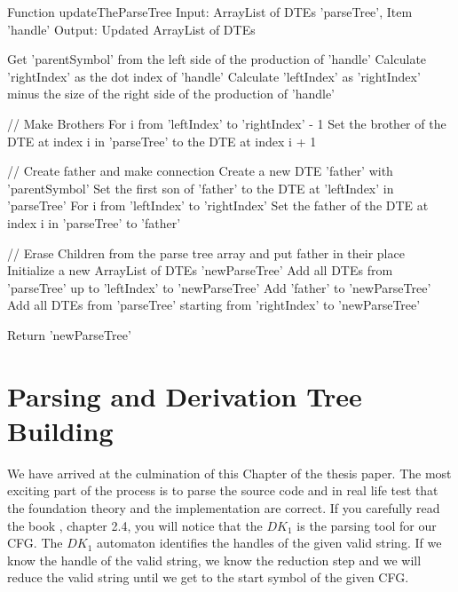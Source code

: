 \vspace{10pt}

\begin{codeblock}
    Function updateTheParseTree
    Input: ArrayList of DTEs 'parseTree', Item 'handle'
    Output: Updated ArrayList of DTEs

    Get 'parentSymbol' from the left side of the production of 'handle'
    Calculate 'rightIndex' as the dot index of 'handle'
    Calculate 'leftIndex' as 'rightIndex' minus the size of the right side of the production of 'handle'

    // Make Brothers
    For i from 'leftIndex' to 'rightIndex' - 1
    Set the brother of the DTE at index i in 'parseTree' to the DTE at index i + 1

    // Create father and make connection
    Create a new DTE 'father' with 'parentSymbol'
    Set the first son of 'father' to the DTE at 'leftIndex' in 'parseTree'
    For i from 'leftIndex' to 'rightIndex'
    Set the father of the DTE at index i in 'parseTree' to 'father'

    // Erase Children from the parse tree array and put father in their place
    Initialize a new ArrayList of DTEs 'newParseTree'
    Add all DTEs from 'parseTree' up to 'leftIndex' to 'newParseTree'
    Add 'father' to 'newParseTree'
    Add all DTEs from 'parseTree' starting from 'rightIndex' to 'newParseTree'

    Return 'newParseTree'
\end{codeblock}

\newpage


\section{Parsing and Derivation Tree Building}\label{sec:Parsing and Derivation Tree Building}

We have arrived at the culmination of this Chapter of the thesis paper. The most exciting part of the process is to parse the source code and in real life test that the foundation theory and the implementation are correct. If you carefully read the book \cite{sipser}, chapter 2.4, you will notice that the \(DK_{1}\) is the parsing tool for our CFG. The \(DK_{1}\) automaton identifies the handles of the given valid string. If we know the handle of the valid string, we know the reduction step and we will reduce the valid string until we get to the start symbol of the given CFG.\\

